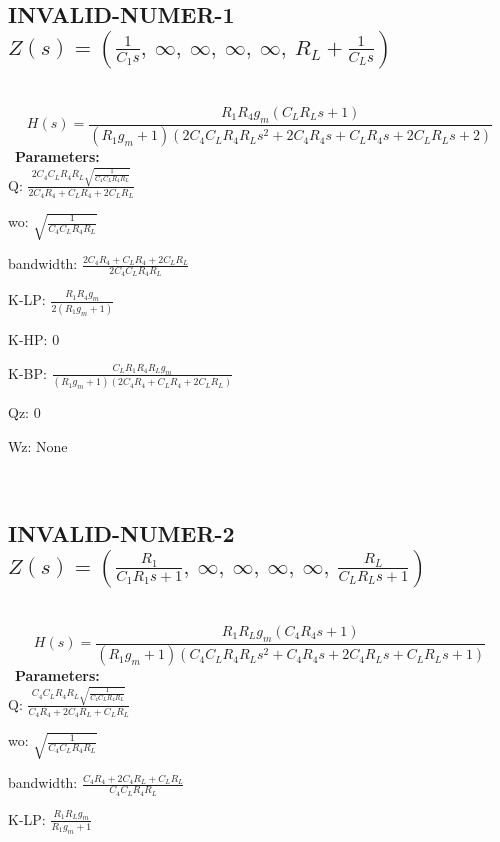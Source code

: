 \documentclass{article}
\begin{document}
\subsection{INVALID-NUMER-1 $Z(s) = \left( \frac{1}{C_{1} s}, \  \infty, \  \infty, \  \infty, \  \infty, \  R_{L} + \frac{1}{C_{L} s}\right)$ } \ 
\textbf{\[H(s) = \frac{R_{1} R_{4} g_{m} \left(C_{L} R_{L} s + 1\right)}{\left(R_{1} g_{m} + 1\right) \left(2 C_{4} C_{L} R_{4} R_{L} s^{2} + 2 C_{4} R_{4} s + C_{L} R_{4} s + 2 C_{L} R_{L} s + 2\right)}\] } \ 
\textbf{Parameters:}\\ 

Q: $\frac{2 C_{4} C_{L} R_{4} R_{L} \sqrt{\frac{1}{C_{4} C_{L} R_{4} R_{L}}}}{2 C_{4} R_{4} + C_{L} R_{4} + 2 C_{L} R_{L}}$\ 

wo: $\sqrt{\frac{1}{C_{4} C_{L} R_{4} R_{L}}}$\ 

bandwidth: $\frac{2 C_{4} R_{4} + C_{L} R_{4} + 2 C_{L} R_{L}}{2 C_{4} C_{L} R_{4} R_{L}}$\ 

K-LP: $\frac{R_{1} R_{4} g_{m}}{2 \left(R_{1} g_{m} + 1\right)}$\ 

K-HP: $0$\ 

K-BP: $\frac{C_{L} R_{1} R_{4} R_{L} g_{m}}{\left(R_{1} g_{m} + 1\right) \left(2 C_{4} R_{4} + C_{L} R_{4} + 2 C_{L} R_{L}\right)}$\ 

Qz: $0$\ 

Wz: $\text{None}$\ 

\ 

\subsection{INVALID-NUMER-2 $Z(s) = \left( \frac{R_{1}}{C_{1} R_{1} s + 1}, \  \infty, \  \infty, \  \infty, \  \infty, \  \frac{R_{L}}{C_{L} R_{L} s + 1}\right)$ } \ 
\textbf{\[H(s) = \frac{R_{1} R_{L} g_{m} \left(C_{4} R_{4} s + 1\right)}{\left(R_{1} g_{m} + 1\right) \left(C_{4} C_{L} R_{4} R_{L} s^{2} + C_{4} R_{4} s + 2 C_{4} R_{L} s + C_{L} R_{L} s + 1\right)}\] } \ 
\textbf{Parameters:}\\ 

Q: $\frac{C_{4} C_{L} R_{4} R_{L} \sqrt{\frac{1}{C_{4} C_{L} R_{4} R_{L}}}}{C_{4} R_{4} + 2 C_{4} R_{L} + C_{L} R_{L}}$\ 

wo: $\sqrt{\frac{1}{C_{4} C_{L} R_{4} R_{L}}}$\ 

bandwidth: $\frac{C_{4} R_{4} + 2 C_{4} R_{L} + C_{L} R_{L}}{C_{4} C_{L} R_{4} R_{L}}$\ 

K-LP: $\frac{R_{1} R_{L} g_{m}}{R_{1} g_{m} + 1}$\ 
\end{document}
